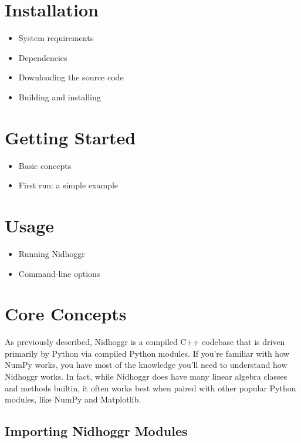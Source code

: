 \documentclass[12pt]{article}
\begin{document}
\newpage
	
	\section{Installation}
	\begin{itemize}
		\item System requirements
		\item Dependencies
		\item Downloading the source code
		\item Building and installing
	\end{itemize}

\newpage
	
	\section{Getting Started}
	\begin{itemize}
		\item Basic concepts
		\item First run: a simple example
	\end{itemize}

\newpage
	
	\section{Usage}
	\begin{itemize}
		\item Running Nidhoggr
		\item Command-line options
	\end{itemize}

\newpage
	
	\section{Core Concepts}
	
As previously described, Nidhoggr is a compiled C++ codebase that is driven primarily by Python via compiled Python modules. If you're familiar with how NumPy works, you have most of the knowledge you'll need to understand how Nidhoggr works. In fact, while Nidhoggr does have many linear algebra classes and methods builtin, it often works best when paired with other popular Python modules, like NumPy and Matplotlib.

\subsection{Importing Nidhoggr Modules}
\end{document}
